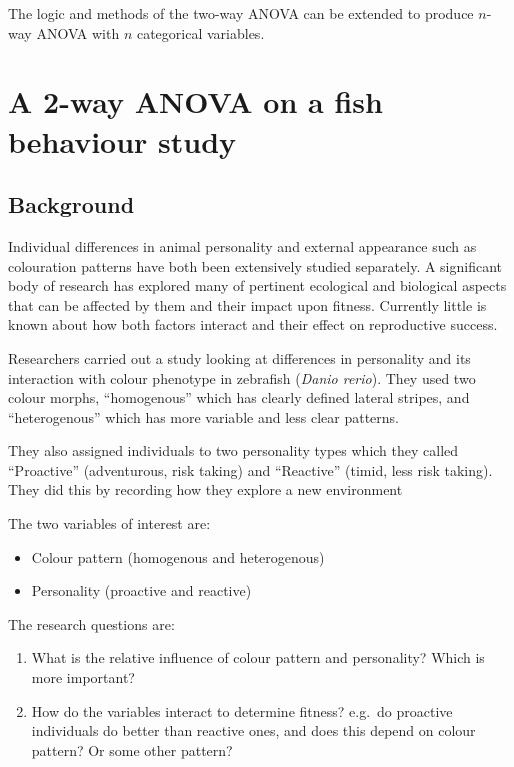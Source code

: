 \documentclass[
  a4paperpaper,
]{book}
\providecommand{\tightlist}{%
  \setlength{\itemsep}{0pt}\setlength{\parskip}{0pt}}
\begin{document}
The logic and methods of the two-way ANOVA can be extended to produce \(n\)-way ANOVA with \(n\) categorical variables.

\hypertarget{a-2-way-anova-on-a-fish-behaviour-study}{%
\section{A 2-way ANOVA on a fish behaviour study}\label{a-2-way-anova-on-a-fish-behaviour-study}}

\hypertarget{background-1}{%
\subsection{Background}\label{background-1}}

Individual differences in animal personality and external appearance such as colouration patterns have both been extensively studied separately. A significant body of research has explored many of pertinent ecological and biological aspects that can be affected by them and their impact upon fitness. Currently little is known about how both factors interact and their effect on reproductive success.

Researchers carried out a study looking at differences in personality and its interaction with colour phenotype in zebrafish (\emph{Danio rerio}). They used two colour morphs, ``homogenous'' which has clearly defined lateral stripes, and ``heterogenous'' which has more variable and less clear patterns.

They also assigned individuals to two personality types which they called ``Proactive'' (adventurous, risk taking) and ``Reactive'' (timid, less risk taking). They did this by recording how they explore a new environment

The two variables of interest are:

\begin{itemize}
\tightlist
\item
  Colour pattern (homogenous and heterogenous)
\item
  Personality (proactive and reactive)
\end{itemize}

The research questions are:

\begin{enumerate}
\def\labelenumi{\arabic{enumi})}
\tightlist
\item
  What is the relative influence of colour pattern and personality? Which is more important?
\item
  How do the variables interact to determine fitness? e.g.~do proactive individuals do better than reactive ones, and does this depend on colour pattern? Or some other pattern?
\end{enumerate}
\end{document}

